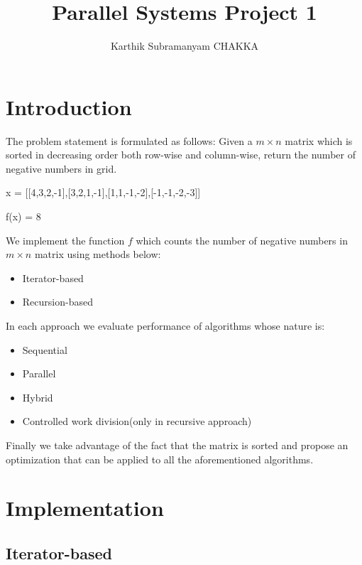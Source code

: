 \documentclass{article}
\begin{document}
\title{Parallel Systems Project 1}
\author{Karthik Subramanyam CHAKKA}
\date{}

\maketitle

\section{Introduction}
The problem statement is formulated as follows:
Given a $m \times n$ matrix which is sorted in decreasing order both row-wise and column-wise, return the number of negative numbers in grid.

\begin{center}
x = [[4,3,2,-1],[3,2,1,-1],[1,1,-1,-2],[-1,-1,-2,-3]]    
\end{center}
\begin{center}
f(x) = 8
\end{center}

We implement the function $f$ which counts the number of negative numbers in $m \times n$ matrix using methods below:
\begin{itemize}
    \item Iterator-based
    \item Recursion-based
\end{itemize}

In each approach we evaluate performance of algorithms whose nature is:
\begin{itemize}
    \item Sequential
    \item Parallel
    \item Hybrid
    \item Controlled work division(only in recursive approach)
\end{itemize}

Finally we take advantage of the fact that the matrix is sorted and propose an optimization that can be applied to all the aforementioned algorithms.

\section{Implementation}


\subsection{Iterator-based}
\end{document}
